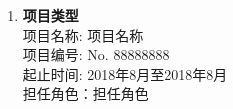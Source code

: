 \begin{project}
\renewcommand{\labelenumi}{\textbf{\arabic{enumi}.}}
   \begin{enumerate}
    \item   \textbf{项目类型}\\  
            项目名称: 项目名称 \\
            项目编号: No. 88888888 \\
            起止时间: 2018年8月至2018年8月 \\
            担任角色：担任角色 \\
   \end{enumerate}
\end{project} 